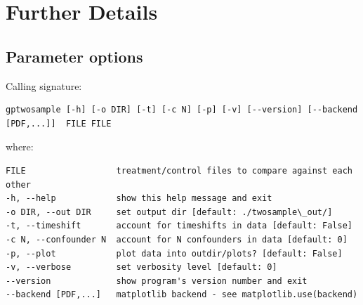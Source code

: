 \documentclass[letterpaper,10pt,english]{sphinxmanual}
\begin{document}
\section{Further Details}
\label{index:further-details}

\subsection{Parameter options}
\label{usage:usage}\label{usage:parameter-options}\label{usage::doc}
Calling signature:

\begin{Verbatim}[commandchars=\\\{\}]
gptwosample [-h] [-o DIR] [-t] [-c N] [-p] [-v] [--version] [--backend [PDF,...]]  FILE FILE
\end{Verbatim}

where:

\begin{Verbatim}[commandchars=\\\{\}]
FILE                  treatment/control files to compare against each other
-h, --help            show this help message and exit
-o DIR, --out DIR     set output dir [default: ./twosample\_out/]
-t, --timeshift       account for timeshifts in data [default: False]
-c N, --confounder N  account for N confounders in data [default: 0]
-p, --plot            plot data into outdir/plots? [default: False]
-v, --verbose         set verbosity level [default: 0]
--version             show program's version number and exit
--backend [PDF,...]   matplotlib backend - see matplotlib.use(backend)
\end{Verbatim}
\end{document}
